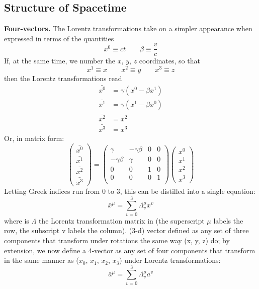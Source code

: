 \documentclass[../../../main.tex]{subfiles}
\begin{document}
\subsection{Structure of Spacetime}
\textbf{Four-vectors.} The Lorentz transformations take on a simpler appearance when expressed in terms of the quantities
\begin{equation*}
    x^0\equiv ct\qquad \beta\equiv \frac{v}{c}
\end{equation*}
If, at the same time, we number the $x$, $y$, $z$ coordinates, so that
\begin{equation*}
    x^1\equiv x\qquad x^2\equiv y\qquad x^3\equiv z
\end{equation*}
then the Lorentz transformations read
\begin{align*}
    \bar{x^0} &= \gamma (x^0 - \beta x^1)\\
    \bar{x^1} &= \gamma(x^1-\beta x^0)\\
    \bar{x^2} &= x^2\\
    \bar{x^3}&=x^3
\end{align*}
Or, in matrix form:
\begin{equation*}
    \begin{pmatrix}
        \bar{x^0}\\
        \bar{x^1}\\
        \bar{x^2}\\
        \bar{x^3}
    \end{pmatrix}=
    \begin{pmatrix}
        \gamma&-\gamma\beta&0&0\\
        -\gamma\beta&\gamma&0&0\\
        0&0&1&0\\
        0&0&0&1\\
    \end{pmatrix}
    \begin{pmatrix}
        {x^0}\\
        {x^1}\\
        {x^2}\\
        {x^3}
    \end{pmatrix}
\end{equation*}
Letting Greek indices run from 0 to 3, this can be distilled into a single equation:
\begin{equation*}
\bar{x}^{\mu}=\sum_{v=0}^{3}\Lambda_{v}^{\mu}x^v
\end{equation*}
where is $\Lambda$ the Lorentz transformation matrix in (the superscript $\mu$ labels the row, the subscript v labels the column). (3-d) vector defined as any set of three components that transform under rotations the same way (x, y, z) do; by extension, we now define a 4-vector as any set of four components that transform in the same manner as ($x_0$, $x_1$, $x_2$, $x_3$) under Lorentz transformations:
\begin{equation*}
\bar{a}^{\mu}=\sum_{v=0}^{3}\Lambda_{v}^{\mu}a^v
\end{equation*}
\end{document}
